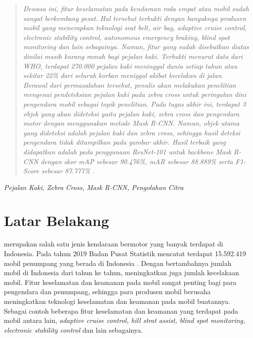 \documentclass[conference]{IEEEtran}
\begin{document}
	
	\begin{abstract}
		\textit{Dewasa ini, fitur keselamatan pada kendaraan roda empat atau mobil sudah sangat berkembang pesat. Hal tersebut terbukti dengan banyaknya produsen mobil yang menerapkan teknologi \textit{seat belt, air bag, adaptive cruise control, electronic stability control, autonomous emergency braking, blind spot monitoring} dan lain sebagainya. Namun, fitur yang sudah disebutkan diatas dinilai masih kurang ramah bagi pejalan kaki. Terbukti menurut data dari WHO, terdapat 270.000 pejalan kaki meninggal dunia setiap tahun atau sekitar 22\% dari seluruh korban meniggal akibat kecelakan di jalan. Berawal dari permasalahan tersebut, penulis akan melakukan penelitian mengenai pendeteksian pejalan kaki pada \textit{zebra cross} untuk peringatan dini pengendara mobil sebagai topik penelitian. Pada tugas akhir ini, terdapat 3 objek yang akan dideteksi yaitu pejalan kaki, \textit{zebra cross} dan pengendara motor dengan menggunakan metode Mask R-CNN. Namun, objek utama yang dideteksi adalah pejalan kaki dan zebra cross, sehingga hasil deteksi pengendara tidak ditampilkan pada gambar akhir. Hasil terbaik yang didapatkan adalah pada penggunaan \textit{ResNet-101} untuk \textit{backbone Mask R-CNN} dengan skor \textit{mAP} sebesar 90.476\%, mAR sebesar 88.889\% serta \textit{F1-Score} sebesar 87.777\% .}
	\end{abstract}
	\begin{IEEEkeywords}
		\textit{Pejalan Kaki, Zebra Cross, Mask R-CNN, Pengolahan Citra}
	\end{IEEEkeywords}
	
	\section{Latar Belakang}
	 merupakan salah satu jenis kendaraan bermotor yang banyak terdapat di Indonesia. Pada tahun 2019 Badan Pusat Statistik mencatat terdapat 15.592.419 mobil penumpang yang berada di Indonesia \cite{cit:13}. Dengan bertambahnya jumlah mobil di Indonesia dari tahun ke tahun, meningkatkan juga jumlah kecelakaan mobil. Fitur keselamatan dan keamanan pada mobil sangat penting bagi para pengendara dan penumpang, sehingga para produsen mobil berusaha meningkatkan teknologi keselamatan dan keamanan pada mobil buatannya. Sebagai contoh beberapa fitur keselamatan dan keamanan yang terdapat pada mobil antara lain, \textit{adaptive cruise control, hill strat assist, blind spot monitoring, electronic stability control} dan lain sebagainya.
	
\end{document}
